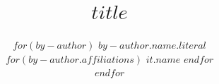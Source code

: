 \title{$title$}

\author{
  $for(by-author)$
    {$by-author.name.literal$  \href{mailto:$by-author.email$}{\Letter}} \\
    $for(by-author.affiliations)$
      $it.name$
    $endfor$ \\
  $endfor$}

